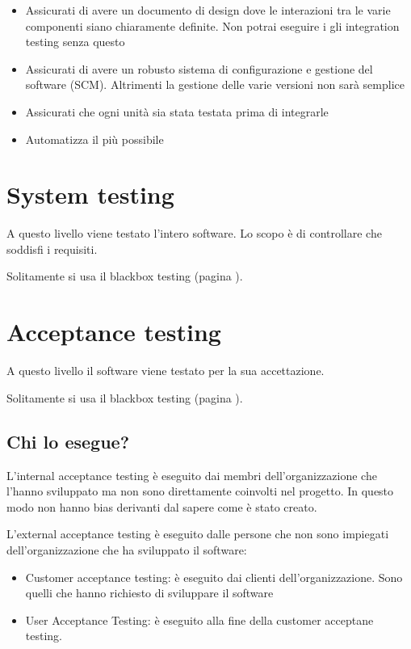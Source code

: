 \documentclass[11pt,a4paper]{book}
\begin{document}
\begin{itemize}
	\item Assicurati di avere un documento di design dove le interazioni tra le varie componenti siano chiaramente definite. Non potrai eseguire i gli integration testing senza questo
	\item Assicurati di avere un robusto sistema di configurazione e gestione del software (SCM). Altrimenti la gestione delle varie versioni non sarà semplice
	\item Assicurati che ogni unità sia stata testata prima di integrarle
	\item Automatizza il più possibile
\end{itemize}

\section{System testing}
A questo livello viene testato l'intero software. Lo scopo è di controllare che soddisfi i requisiti.

Solitamente si usa il blackbox testing (pagina \pageref{par: blackbox}).

\section{Acceptance testing}
A questo livello il software viene testato per la sua accettazione.

Solitamente si usa il blackbox testing (pagina \pageref{par: blackbox}).

\subsection{Chi lo esegue?}
L'internal acceptance testing è eseguito dai membri dell'organizzazione che l'hanno sviluppato ma non sono direttamente coinvolti nel progetto. In questo modo non hanno bias derivanti dal sapere come è stato creato.

L'external acceptance testing è eseguito dalle persone che non sono impiegati dell'organizzazione che ha sviluppato il software:
\begin{itemize}
	\item Customer acceptance testing: è eseguito dai clienti dell'organizzazione. Sono quelli che hanno richiesto di sviluppare il software
	\item User Acceptance Testing: è eseguito alla fine della customer acceptane testing. 
\end{itemize}
\end{document}
